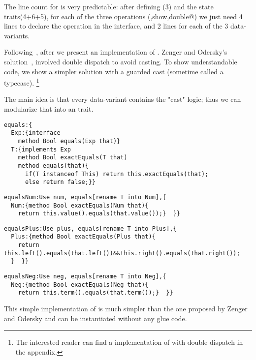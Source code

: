The line count for \name is very predictable: after defining \Q@exp@ (3) and the state traits(4+6+5),
for each of the three operations (\Q@eval,show,double@) 
we just need 4 lines to declare the operation 
in the interface, and 2 lines for each of the 3 data-variants.

Following~\cite{Zenger-Odersky2005}, after \Q@double@ we present an implementation of \Q@equals@.
Zenger and Odersky's solution~\cite{Zenger-Odersky2005}, involved double dispatch to avoid casting.
To show understandable code, we show a simpler solution 
with a guarded cast (sometime called a typecase).%
\footnote{
The interested reader can find a \name implementation of \Q@equals@ with double dispatch
in the appendix.
}

The main idea is that  every data-variant  contains
 the "cast" logic; thus
 we can modularize that into an \Q@equals@ trait.
\begin{lstlisting}
equals:{
  Exp:{interface
    method Bool equals(Exp that)}
  T:{implements Exp
    method Bool exactEquals(T that)
    method equals(that){
      if(T instanceof This) return this.exactEquals(that);
      else return false;}}
\end{lstlisting}
\multiCode
\begin{lstlisting}
equalsNum:Use num, equals[rename T into Num],{
  Num:{method Bool exactEquals(Num that){
    return this.value().equals(that.value());}  }}
\end{lstlisting}
\multiCode
\begin{lstlisting}
equalsPlus:Use plus, equals[rename T into Plus],{
  Plus:{method Bool exactEquals(Plus that){
    return this.left().equals(that.left())&&this.right().equals(that.right());
  }  }}
\end{lstlisting}
\multiCode
\begin{lstlisting}
equalsNeg:Use neg, equals[rename T into Neg],{
  Neg:{method Bool exactEquals(Neg that){
    return this.term().equals(that.term());}  }}
\end{lstlisting}

This simple implementation of \Q@equals@
is much simpler than the one proposed by Zenger and Odersky
 and can be instantiated without any glue code.

